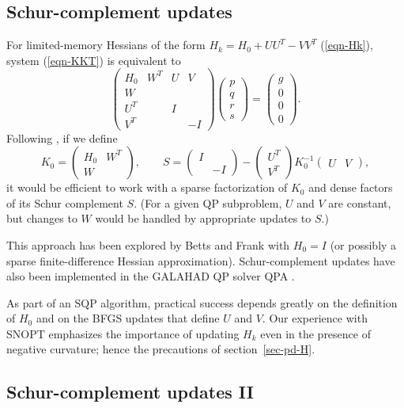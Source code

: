 \documentclass[draft,leqno,onefignum,onetabnum]{siamltex}
\def\inv{^{-1}}
\def\GALAHAD{{\small GALAHAD}}
\def\QPA   {{\small QPA}}
\def\SNOPT {{\small SNOPT}}
\def\SQOPT {{\small SQOPT}}
\newcommand{\pmat}[1]{\begin{pmatrix}#1\end{pmatrix}}
\begin{document}
\subsection{Schur-complement updates} \label{sec-SC}

For limited-memory Hessians of the form $ H_k = H_0 + UU^T - VV^T$
(\ref{eqn-Hk}), system (\ref{eqn-KKT}) is equivalent to
$$
   \pmat{ H_0 & W^T & U & V
       \\ W
       \\ U^T &     & I
       \\ V^T &     &   &-I}
   \pmat{p\\q\\r\\s} = \pmat{g\\0\\0\\0}.
$$
Following \cite[section 3.6.2]{GilMSW84b}, if we define
$$
        K_0 = \pmat{ H_0 & W^T
                  \\ W   &    }, \qquad
        S   = \pmat{I \\ & -I} - \pmat{U^T \\ V^T} K_0 \inv \pmat{U & V},
$$
it would be efficient to work with a sparse factorization of $K_0$
and dense factors of its Schur complement $S$.  (For a given QP
subproblem, $U$ and $V$ are constant, but changes to $W$ would be handled
by appropriate updates to $S$.)

 This approach has been explored by Betts and Frank \cite[section 5]{BF94}
with $H_0 = I$ (or possibly a sparse finite-difference Hessian
approximation).  Schur-complement updates have also been implemented
in the \GALAHAD{} QP solver \QPA{} \cite{Gould:2003:GLT}.

As part of an SQP algorithm, practical success
depends greatly on the definition of $H_0$ and on the BFGS updates that
define $U$ and $V$.  Our experience with \SNOPT{} emphasizes the importance of
updating $H_k$ even in the presence of negative curvature;
hence the precautions of section~\ref{sec-pd-H}.



\subsection{Schur-complement updates II} \label{sec-SC2}
\end{document}
